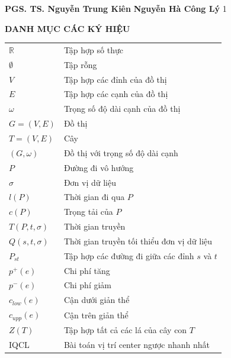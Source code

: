 \documentclass[12pt,oneside,a4paper]{bookAnh1}
\theoremstyle{plain}
\theoremstyle{nonumberplain}
\numberwithin{equation}{chapter}
\begin{document}
\hskip 0cm \textbf{PGS. TS. Nguyễn Trung Kiên}        \hskip 3.7cm \textbf{Nguyễn Hà Công Lý}
{\fontsize{13pt}{12pt}\selectfont\tableofcontents}
\setcounter{tocdepth} {1}
\listoftables %
\listoffigures %
\newpage
\centerline{\bf\fontsize{14pt}{120}\selectfont DANH MỤC CÁC KÝ HIỆU}
\vskip1cm
{\fontsize{13pt}{15pt}\selectfont
\begin{tabular}{ll}
    $\mathbb{R}$ & Tập hợp số thực \\
    $\emptyset$ & Tập rỗng \\
    $V$ & Tập hợp các đỉnh của đồ thị \\
    $E$ & Tập hợp các cạnh của đồ thị \\
    $\omega$ & Trọng số độ dài cạnh của đồ thị \\
    $G = (V, E)$ & Đồ thị \\
    $T = (V, E)$ & Cây \\
    $(G, \omega)$ & Đồ thị với trọng số độ dài cạnh \\
    $P$ & Đường đi vô hướng \\
    $\sigma$ & Đơn vị dữ liệu \\
    $l\left( P \right)$ & Thời gian đi qua $P$ \\
    $c\left( P \right)$ & Trọng tải của $P$ \\
    $T\left( P,t,\sigma  \right)$ & Thời gian truyền \\
    $Q\left( s,t,\sigma  \right)$ & Thời gian truyền tối thiểu đơn vị dữ liệu \\
    ${{P}_{st}}$ & Tập hợp các đường đi giữa các đỉnh $s$ và $t$ \\
    ${{p}^{+}}\left( e \right)$ & Chi phí tăng \\
    ${{p}^{-}}\left( e \right)$ & Chi phí giảm \\
    ${{c}_{low}}\left( e \right)$ & Cận dưới giản thể \\
    ${{c}_{upp}}\left( e \right)$ & Cận trên giản thể \\
    $Z(T)$ & Tập hợp tất cả các lá của cây con $T$\\
    IQCL & Bài toán vị trí center ngược nhanh nhất 
\end{tabular}
\newpage{}

}
\end{document}
